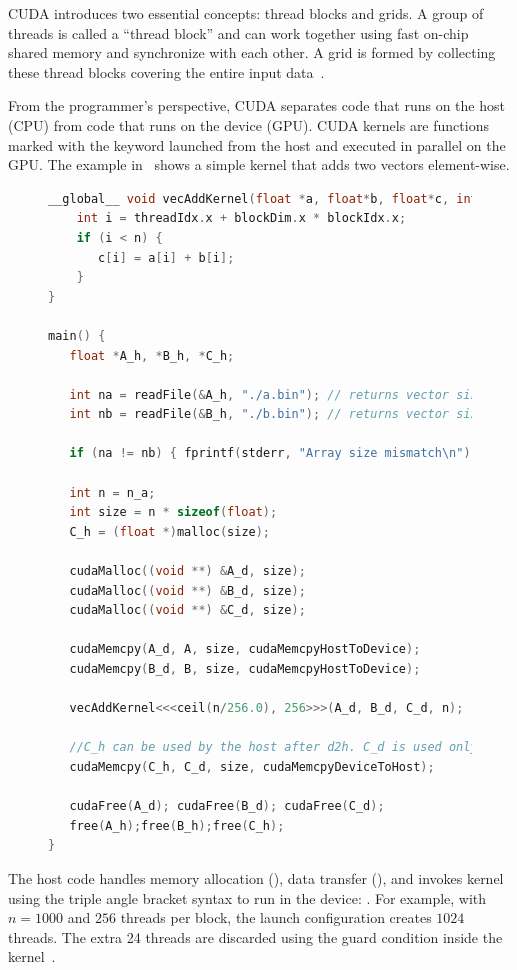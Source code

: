 \documentclass[Ingles]{ic-tese-v3}
\begin{document}
CUDA introduces two essential concepts: thread blocks and grids. A group of threads is called a ``thread block'' and can work together using fast on-chip shared memory and synchronize with each other. A grid is formed by collecting these thread blocks covering the entire input data~\cite{cuda}.

From the programmer's perspective, CUDA separates code that runs on the host (CPU) from code that runs on the device (GPU). CUDA kernels are functions marked with the  keyword launched from the host and executed in parallel on the GPU. The example in~ shows a simple kernel that adds two vectors element-wise.

\begin{figure}[h]
\centering
\begin{lstlisting}[language=C++, caption={CUDA kernel and host code for element-wise vector addition. This is an adapted version from the example given in Hwu, Wen-Mei W~\etal(2022)\cite{kirk}}, label={lst:cudaexample}]
__global__ void vecAddKernel(float *a, float*b, float*c, int n) {
    int i = threadIdx.x + blockDim.x * blockIdx.x;
    if (i < n) {
       c[i] = a[i] + b[i];
    }
}

main() {
   float *A_h, *B_h, *C_h;

   int na = readFile(&A_h, "./a.bin"); // returns vector size
   int nb = readFile(&B_h, "./b.bin"); // returns vector size

   if (na != nb) { fprintf(stderr, "Array size mismatch\n"); return 1;}

   int n = n_a;
   int size = n * sizeof(float);
   C_h = (float *)malloc(size);
 
   cudaMalloc((void **) &A_d, size);
   cudaMalloc((void **) &B_d, size);
   cudaMalloc((void **) &C_d, size);

   cudaMemcpy(A_d, A, size, cudaMemcpyHostToDevice);
   cudaMemcpy(B_d, B, size, cudaMemcpyHostToDevice);

   vecAddKernel<<<ceil(n/256.0), 256>>>(A_d, B_d, C_d, n);

   //C_h can be used by the host after d2h. C_d is used only in GPU.
   cudaMemcpy(C_h, C_d, size, cudaMemcpyDeviceToHost);

   cudaFree(A_d); cudaFree(B_d); cudaFree(C_d);
   free(A_h);free(B_h);free(C_h);
}
\end{lstlisting}
\end{figure}

The host code handles memory allocation (), data transfer (), and invokes kernel using the triple angle bracket syntax to run in the device: . For example, with $n = 1000$ and $256$ threads per block, the launch configuration  creates $1024$ threads. The extra 24 threads are discarded using the guard condition  inside the kernel~\cite{kirk}.
\end{document}
